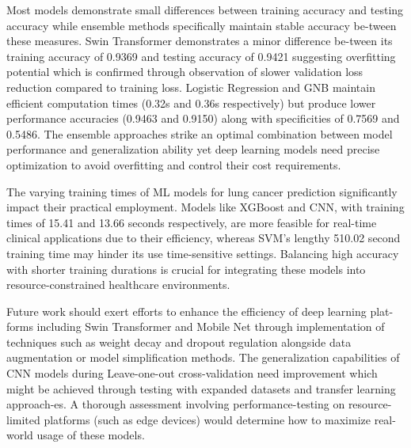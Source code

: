 \documentclass[runningheads]{llncs}
\begin{document}
Most models demonstrate small differences between training accuracy and testing accuracy while ensemble methods specifically maintain stable accuracy be-tween these measures. Swin Transformer demonstrates a minor difference be-tween its training accuracy of 0.9369 and testing accuracy of 0.9421 suggesting overfitting potential which is confirmed through observation of slower validation loss reduction compared to training loss. Logistic Regression and GNB maintain efficient computation times (0.32s and 0.36s respectively) but produce lower performance accuracies (0.9463 and 0.9150) along with specificities of 0.7569 and 0.5486. The ensemble approaches strike an optimal combination between model performance and generalization ability yet deep learning models need precise optimization to avoid overfitting and control their cost requirements.

The varying training times of ML models for lung cancer prediction significantly impact their practical employment. Models like XGBoost and CNN, with training times of 15.41 and 13.66 seconds respectively, are more feasible for real-time clinical applications due to their efficiency, whereas SVM’s lengthy 510.02 second training time may hinder its use time-sensitive settings. Balancing high accuracy with shorter training durations is crucial for integrating these models into resource-constrained healthcare environments.

Future work should exert efforts to enhance the efficiency of deep learning plat-forms including Swin Transformer and Mobile Net through implementation of techniques such as weight decay and dropout regulation alongside data augmentation or model simplification methods. The generalization capabilities of CNN models during Leave-one-out cross-validation need improvement which might be achieved through testing with expanded datasets and transfer learning approach-es. A thorough assessment involving performance-testing on resource-limited platforms (such as edge devices) would determine how to maximize real-world usage of these models.
\end{document}
